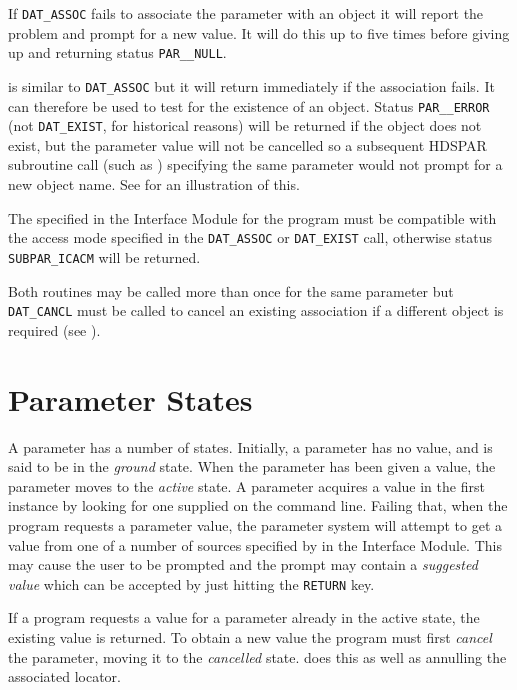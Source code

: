 \documentclass[twoside,11pt,nolof]{starlink}
\begin{document}
If \texttt{DAT\_ASSOC} fails to associate the parameter with an object it
will report the problem and prompt for a new value.
It will do this up to five times before giving up and returning status
\texttt{PAR\_\_NULL}.

 is similar to \texttt{DAT\_ASSOC}
but it will return immediately if the association fails. It can therefore be
used to test for the existence of an object. Status \texttt{PAR\_\_ERROR}
(not \texttt{DAT\_EXIST}, for historical reasons) will be returned if the
object does not exist, but the parameter value will not be cancelled so
a subsequent HDSPAR subroutine call (such as
)
specifying the same parameter would not prompt for a new object name.
See
 for an
illustration of this.

The
specified in the Interface Module for the program must be compatible with
the access mode specified in the
\texttt{DAT\_ASSOC} or \texttt{DAT\_EXIST} call, otherwise status
\texttt{SUBPAR\_ICACM} will be returned.

Both routines may be called more than once for the same parameter but
\texttt{DAT\_CANCL} must be called to cancel an existing association if a
different object is required (see
).

\section{Parameter States\label{parameter_states}}
A parameter has a number of states.  Initially, a parameter has no
value, and is said to be in the \textit{ground\/} state.  When the
parameter has been given a value, the parameter moves to the \textit{active\/}
state.  A parameter acquires a value in the first instance by
looking for one supplied on the command line.  Failing that, when the program
requests a parameter value, the parameter system will attempt to get a value
from one of a number of sources specified by
in the Interface Module.
This may cause the user to be prompted and the prompt may contain a
\textit{suggested value} which can be accepted by just hitting the
\texttt{RETURN} key.

If a program requests a value for a parameter already in the active state,
the existing value is returned.
To obtain a new value the program must first \textit{cancel\/} the
parameter, moving it to the \textit{cancelled\/} state.
 does this as well as annulling the
associated locator.
\end{document}
